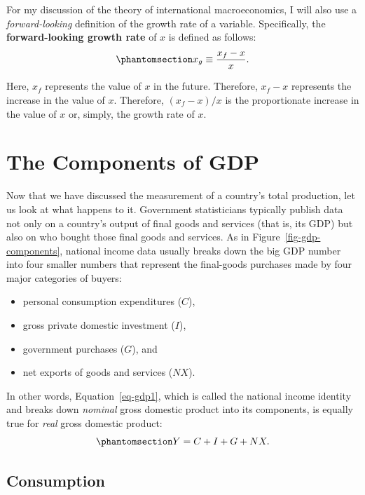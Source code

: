\documentclass[
  letterpaper,
]{book}
\providecommand{\tightlist}{%
  \setlength{\itemsep}{0pt}\setlength{\parskip}{0pt}}\usepackage{longtable,booktabs,array}
\theoremstyle{plain}
\theoremstyle{remark}
\begin{document}
For my discussion of the theory of international macroeconomics, I will
also use a \emph{forward-looking} definition of the growth rate of a
variable. Specifically, the \textbf{forward-looking growth rate} of
\(x\) is defined as follows:
\begin{equation}\phantomsection\label{eq-f-growthrate}{
x_g\equiv\frac{x_f-x}{x}.
}\end{equation}

Here, \(x_f\) represents the value of \(x\) in the future. Therefore,
\(x_f-x\) represents the increase in the value of \(x\). Therefore,
\((x_f-x)/x\) is the proportionate increase in the value of \(x\) or,
simply, the growth rate of \(x\).

\section{The Components of GDP}\label{sec-gdp-components}

Now that we have discussed the measurement of a country's total
production, let us look at what happens to it. Government statisticians
typically publish data not only on a country's output of final goods and
services (that is, its GDP) but also on who bought those final goods and
services. As in Figure~\ref{fig-gdp-components}, national income data
usually breaks down the big GDP number into four smaller numbers that
represent the final-goods purchases made by four major categories of
buyers:

\begin{itemize}
\tightlist
\item
  personal consumption expenditures (\(C\)),
\item
  gross private domestic investment (\(I\)),
\item
  government purchases (\(G\)), and
\item
  net exports of goods and services (\(NX\)).
\end{itemize}

In other words, Equation~\ref{eq-gdp1}, which is called the national
income identity and breaks down \emph{nominal} gross domestic product
into its components, is equally true for \emph{real} gross domestic
product: \begin{equation}\phantomsection\label{eq-nii}{
Y=C+I+G+NX.
}\end{equation}

\subsection{Consumption}\label{sec-consumption-nia}
\end{document}
